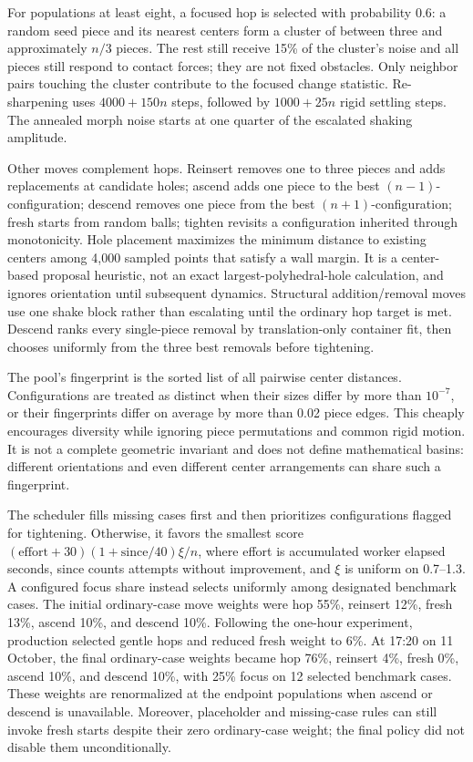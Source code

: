 \documentclass[11pt,a4paper]{article}
\begin{document}
For populations at least eight, a focused hop is selected with probability 0.6: a random seed piece and its nearest centers form a cluster of between three and approximately \(n/3\) pieces. The rest still receive 15\% of the cluster's noise and all pieces still respond to contact forces; they are not fixed obstacles. Only neighbor pairs touching the cluster contribute to the focused change statistic. Re-sharpening uses \(4000+150n\) steps, followed by \(1000+25n\) rigid settling steps. The annealed morph noise starts at one quarter of the escalated shaking amplitude.

Other moves complement hops. Reinsert removes one to three pieces and adds replacements at candidate holes; ascend adds one piece to the best \((n-1)\)-configuration; descend removes one piece from the best \((n+1)\)-configuration; fresh starts from random balls; tighten revisits a configuration inherited through monotonicity. Hole placement maximizes the minimum distance to existing centers among 4,000 sampled points that satisfy a wall margin. It is a center-based proposal heuristic, not an exact largest-polyhedral-hole calculation, and ignores orientation until subsequent dynamics. Structural addition/removal moves use one shake block rather than escalating until the ordinary hop target is met. Descend ranks every single-piece removal by translation-only container fit, then chooses uniformly from the three best removals before tightening.

The pool's fingerprint is the sorted list of all pairwise center distances. Configurations are treated as distinct when their sizes differ by more than \(10^{-7}\), or their fingerprints differ on average by more than 0.02 piece edges. This cheaply encourages diversity while ignoring piece permutations and common rigid motion. It is not a complete geometric invariant and does not define mathematical basins: different orientations and even different center arrangements can share such a fingerprint.

The scheduler fills missing cases first and then prioritizes configurations flagged for tightening. Otherwise, it favors the smallest score \((\mathrm{effort}+30)(1+\mathrm{since}/40)\xi/n\), where effort is accumulated worker elapsed seconds, since counts attempts without improvement, and \(\xi\) is uniform on 0.7--1.3. A configured focus share instead selects uniformly among designated benchmark cases. The initial ordinary-case move weights were hop 55\%, reinsert 12\%, fresh 13\%, ascend 10\%, and descend 10\%. Following the one-hour experiment, production selected gentle hops and reduced fresh weight to 6\%. At 17:20 on 11 October, the final ordinary-case weights became hop 76\%, reinsert 4\%, fresh 0\%, ascend 10\%, and descend 10\%, with 25\% focus on 12 selected benchmark cases. These weights are renormalized at the endpoint populations when ascend or descend is unavailable. Moreover, placeholder and missing-case rules can still invoke fresh starts despite their zero ordinary-case weight; the final policy did not disable them unconditionally.
\end{document}
